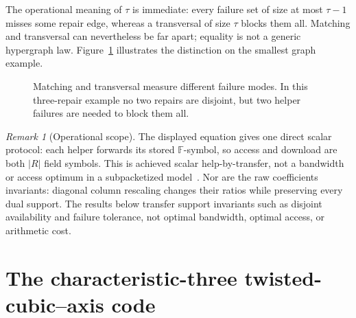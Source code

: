 \documentclass[11pt]{article}
\theoremstyle{definition}
\theoremstyle{remark}
\newtheorem{remark}[theorem]{Remark}
\newcommand{\F}{\mathbb{F}}
\begin{document}
The operational meaning of $\tau$ is immediate: every failure set of size
at most $\tau-1$ misses some repair edge, whereas a transversal of size
$\tau$ blocks them all.  Matching and transversal can nevertheless be far
apart; equality is not a generic hypergraph law.
Figure~\ref{fig:matching-transversal} illustrates the distinction on the
smallest graph example.

\begin{figure}[ht]
\centering
{}
\caption{Matching and transversal measure different failure modes.  In this
three-repair example no two repairs are disjoint, but two helper failures are
needed to block them all.}
\label{fig:matching-transversal}
\end{figure}

\begin{remark}[Operational scope]\label{rem:operational-scope}
The displayed equation gives one direct scalar protocol: each helper
forwards its stored $\F$-symbol, so access and download are both $|R|$ field
symbols.  This is achieved scalar help-by-transfer, not a bandwidth or access
optimum in a subpacketized model~\cite{ShahEtAl2010,GuruswamiWootters2016,YeBarg2016}.
Nor are the raw coefficients invariants: diagonal column rescaling changes
their ratios while preserving every dual support.  The results below transfer
support invariants such as disjoint availability and failure tolerance, not
optimal bandwidth, optimal access, or arithmetic cost.
\end{remark}

\section{The characteristic-three twisted-cubic--axis code}
\label{sec:seed}
\end{document}
